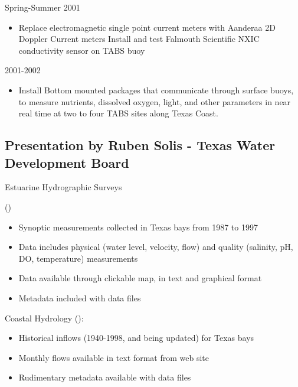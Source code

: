 Spring-Summer 2001

\begin{itemize}
\item Replace electromagnetic single point current meters with
  Aanderaa 2D Doppler Current meters Install and test Falmouth
  Scientific NXIC conductivity sensor on TABS buoy
\end{itemize}

2001-2002

\begin{itemize}
\item Install Bottom mounted packages that communicate through surface
  buoys, to measure nutrients, dissolved oxygen, light, and other
  parameters in near real time at two to four TABS sites along Texas
  Coast.
\end{itemize}

\subsection{Presentation by Ruben Solis - Texas Water Development Board}

Estuarine Hydrographic Surveys
 
()

\begin{itemize}
\item Synoptic measurements collected in Texas bays from 1987 to 1997
\item Data includes physical (water level, velocity, flow) and quality (salinity, pH, DO, temperature) 
measurements
\item Data available through clickable map, in text and graphical format
\item Metadata included with data files
\end{itemize}

Coastal Hydrology (): 
\begin{itemize}
\item Historical inflows (1940-1998, and being updated) for Texas bays
\item Monthly flows available in text format from web site
\item Rudimentary metadata available with data files
\end{itemize}

